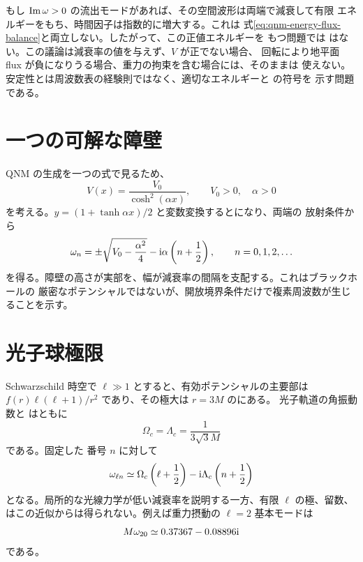もし $\operatorname{Im}\omega>0$ の流出モードがあれば、その空間波形は両端で減衰して有限
エネルギーをもち、時間因子は指数的に増大する。これは
式\eqref{eq:qnm-energy-flux-balance}と両立しない。したがって、この正値エネルギーを
もつ問題では はない。この議論は減衰率の値を与えず、$V$ が正でない場合、
回転により地平面 flux が負になりうる場合、重力の拘束を含む場合には、そのままは
使えない。安定性とは周波数表の経験則ではなく、適切なエネルギーと の符号を
示す問題である。

\section{一つの可解な障壁}

QNM の生成を一つの式で見るため、
\begin{equation}
V(x)
=
\frac{V_0}{\cosh^2(\alpha x)},
\qquad
V_0>0,
\quad
\alpha>0
\label{eq:poschl_teller_potential}
\end{equation}
を考える。$y=(1+\tanh\alpha x)/2$ と変数変換するとになり、両端の
放射条件から
\begin{equation}
\omega_n
=
\mathord{\pm}
\sqrt{V_0-\frac{\alpha^2}{4}}
-\mathrm{i}\alpha\left(n+\frac{1}{2}\right),
\qquad
n=0,1,2,\ldots
\label{eq:poschl_teller_qnm}
\end{equation}
を得る。障壁の高さが実部を、幅が減衰率の間隔を支配する。これはブラックホールの
厳密なポテンシャルではないが、開放境界条件だけで複素周波数が生じることを示す。

\section{光子球極限}

Schwarzschild 時空で $\ell\gg1$ とすると、有効ポテンシャルの主要部は
$f(r)\ell(\ell+1)/r^2$ であり、その極大は $r=3M$ のにある。
光子軌道の角振動数と はともに
\begin{equation}
\Omega_c
=
\Lambda_c
=
\frac{1}{3\sqrt{3}M}
\end{equation}
である。固定した  番号 $n$ に対して
\begin{equation}
\omega_{\ell n}
\simeq
\Omega_c\left(\ell+\frac{1}{2}\right)
-\mathrm{i}\Lambda_c\left(n+\frac{1}{2}\right)
\label{eq:eikonal_qnm}
\end{equation}
となる。局所的な光線力学が低い減衰率を説明する一方、有限 $\ell$ の極、留数、
 はこの近似からは得られない。例えば重力摂動の $\ell=2$ 基本モードは
\begin{equation}
M\omega_{20}
\simeq
0.37367-0.08896\mathrm{i}
\label{eq:schwarzschild_fundamental_qnm}
\end{equation}
である\cite{Berti:2009kk}。

